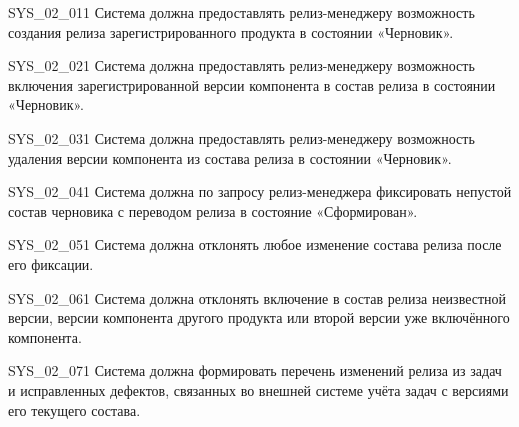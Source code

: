 \documentclass{tpks}
\begin{document}
\begin{req}{SYS_02_01}{1}
Система должна предоставлять релиз-менеджеру возможность создания релиза зарегистрированного продукта в состоянии «Черновик».
\end{req}

\begin{req}{SYS_02_02}{1}
Система должна предоставлять релиз-менеджеру возможность включения зарегистрированной версии компонента в состав релиза в состоянии «Черновик».
\end{req}

\begin{req}{SYS_02_03}{1}
Система должна предоставлять релиз-менеджеру возможность удаления версии компонента из состава релиза в состоянии «Черновик».
\end{req}

\begin{req}{SYS_02_04}{1}
Система должна по запросу релиз-менеджера фиксировать непустой состав черновика с переводом релиза в состояние «Сформирован».
\end{req}

\begin{req}{SYS_02_05}{1}
Система должна отклонять любое изменение состава релиза после его фиксации.
\end{req}

\begin{req}{SYS_02_06}{1}
Система должна отклонять включение в состав релиза неизвестной версии, версии компонента другого продукта или второй версии уже включённого компонента.
\end{req}

\begin{req}{SYS_02_07}{1}
Система должна формировать перечень изменений релиза из задач и исправленных дефектов, связанных во внешней системе учёта задач с версиями его текущего состава.
\end{req}
\end{document}
